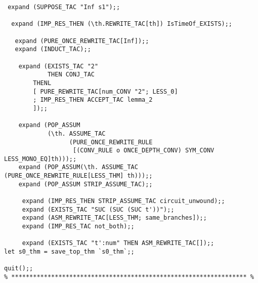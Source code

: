 \begin{verbatim}
 expand (SUPPOSE_TAC "Inf s1");;

  expand (IMP_RES_THEN (\th.REWRITE_TAC[th]) IsTimeOf_EXISTS);;

   expand (PURE_ONCE_REWRITE_TAC[Inf]);;
   expand (INDUCT_TAC);;
   
    expand (EXISTS_TAC "2"
            THEN CONJ_TAC
	    THENL
	    [ PURE_REWRITE_TAC[num_CONV "2"; LESS_0]
	    ; IMP_RES_THEN ACCEPT_TAC lemma_2
	    ]);;

    expand (POP_ASSUM
            (\th. ASSUME_TAC
                  (PURE_ONCE_REWRITE_RULE
                   [(CONV_RULE o ONCE_DEPTH_CONV) SYM_CONV LESS_MONO_EQ]th)));;
    expand (POP_ASSUM(\th. ASSUME_TAC (PURE_ONCE_REWRITE_RULE[LESS_THM] th)));;
    expand (POP_ASSUM STRIP_ASSUME_TAC);;    

     expand (IMP_RES_THEN STRIP_ASSUME_TAC circuit_unwound);;
     expand (EXISTS_TAC "SUC (SUC (SUC t'))");;
     expand (ASM_REWRITE_TAC[LESS_THM; same_branches]);;
     expand (IMP_RES_TAC not_both);;

     expand (EXISTS_TAC "t':num" THEN ASM_REWRITE_TAC[]);;
let s0_thm = save_top_thm `s0_thm`;;

quit();;
% ***************************************************************** %
\end{verbatim}


\newpage

